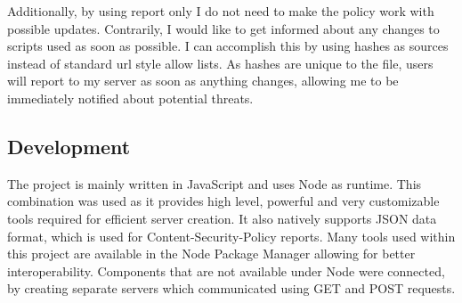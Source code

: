 Additionally, by using report only I do not need to make the policy work with possible updates.
Contrarily, I would like to get informed about any changes to scripts used as soon as possible.
I can accomplish this by using hashes as sources instead of standard url style allow lists.
As hashes are unique to the file, users will report to my server as soon as anything changes, allowing me to be immediately notified about potential threats.

\subsection{Development}

The project is mainly written in JavaScript and uses Node as runtime.
This combination was used as it provides high level, powerful and very customizable tools required for efficient server creation.
It also natively supports JSON data format, which is used for Content-Security-Policy reports.
Many tools used within this project are available in the Node Package Manager allowing for better interoperability.
Components that are not available under Node were connected, by creating separate servers which communicated using GET and POST requests.

